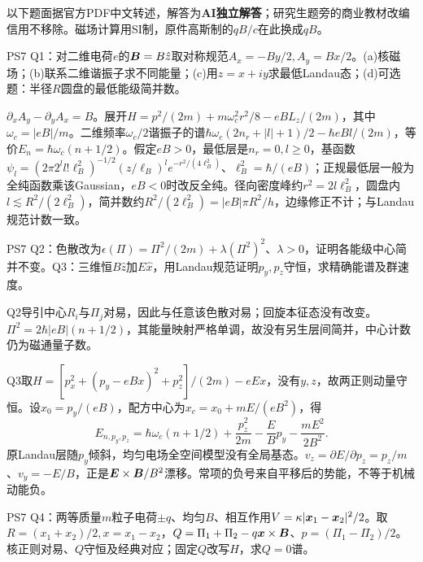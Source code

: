 以下题面据官方PDF中文转述，解答为\textbf{AI独立解答}；研究生题旁的商业教材改编信用不移除。磁场计算用SI制，原件高斯制的$qB/c$在此换成$qB$。

\begin{exercise}
PS7 Q1：对二维电荷$e$的$\boldsymbol{B}=B\hat z$取对称规范$A_x=-By/2,A_y=Bx/2$。(a)核磁场；(b)联系二维谐振子求不同能量；(c)用$z=x+iy$求最低Landau态；(d)可选题：半径$R$圆盘的最低能级简并数。
\end{exercise}
\begin{solution}
$\partial_xA_y-\partial_yA_x=B$。展开$H=p^2/(2m)+m\omega_c^2r^2/8-eBL_z/(2m)$，其中$\omega_c=|eB|/m$。二维频率$\omega_c/2$谐振子的谱$\hbar\omega_c(2n_r+|l|+1)/2-\hbar eBl/(2m)$，等价$E_n=\hbar\omega_c(n+1/2)$。假定$eB>0$，最低层是$n_r=0,l\ge0$，基函数
$\psi_l=(2\pi2^ll!\ell_B^2)^{-1/2}(z/\ell_B)^l e^{-r^2/(4\ell_B^2)}$、$\ell_B^2=\hbar/(eB)$；正规最低层一般为全纯函数乘该Gaussian，$eB<0$时改反全纯。径向密度峰约$r^2=2l\ell_B^2$，圆盘内$l\lesssim R^2/(2\ell_B^2)$，简并数约$R^2/(2\ell_B^2)=|eB|\pi R^2/h$，边缘修正不计；与Landau规范计数一致。
\end{solution}
\begin{exercise}
PS7 Q2：色散改为$\epsilon(\Pi)=\Pi^2/(2m)+\lambda(\Pi^2)^2$、$\lambda>0$，证明各能级中心简并不变。Q3：三维恒$B\hat z$加$E\hat x$，用Landau规范证明$p_y,p_z$守恒，求精确能谱及群速度。
\end{exercise}
\begin{solution}
Q2导引中心$R_i$与$\Pi_j$对易，因此与任意该色散对易；回旋本征态没有改变。$\Pi^2=2\hbar|eB|(n+1/2)$，其能量映射严格单调，故没有另生层间简并，中心计数仍为磁通量子数。

Q3取$H=[p_x^2+(p_y-eBx)^2+p_z^2]/(2m)-eEx$，没有$y,z$，故两正则动量守恒。设$x_0=p_y/(eB)$，配方中心为$x_c=x_0+mE/(eB^2)$，得
\[
 E_{n,p_y,p_z}=\hbar\omega_c(n+1/2)+\frac{p_z^2}{2m}
 -\frac EBp_y-\frac{mE^2}{2B^2}.
\]
原Landau层随$p_y$倾斜，均匀电场全空间模型没有全局基态。$v_z=\partial E/\partial p_z=p_z/m$、$v_y=-E/B$，正是$\boldsymbol{E}\times\boldsymbol{B}/B^2$漂移。常项的负号来自平移后的势能，不等于机械动能负。
\end{solution}
\begin{exercise}
PS7 Q4：两等质量$m$粒子电荷$\pm q$、均匀$B$、相互作用$V=\kappa|\boldsymbol{x}_1-\boldsymbol{x}_2|^2/2$。取$R=(x_1+x_2)/2,x=x_1-x_2$，$Q=\Pi_1+\Pi_2-q\boldsymbol{x}\times\boldsymbol{B}$、$p=(\Pi_1-\Pi_2)/2$。核正则对易、$Q$守恒及经典对应；固定$Q$改写$H$，求$Q=0$谱。
\end{exercise}
